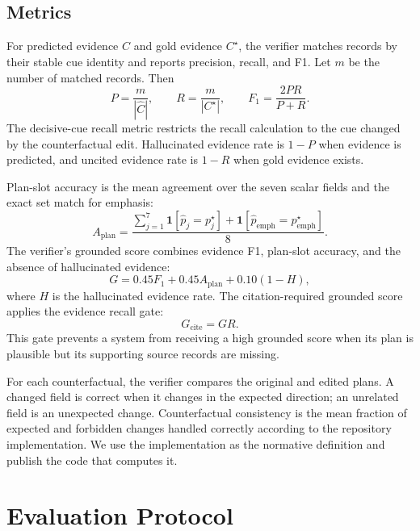 \documentclass{article}
\begin{document}
\subsection{Metrics}

For predicted evidence $\hat{C}$ and gold evidence $C^{\star}$, the verifier matches records by their stable cue identity and reports precision, recall, and F1. Let $m$ be the number of matched records. Then
\begin{equation}
 P = \frac{m}{|\hat{C}|}, \qquad R = \frac{m}{|C^{\star}|}, \qquad F_1 = \frac{2PR}{P+R}.
\end{equation}
The decisive-cue recall metric restricts the recall calculation to the cue changed by the counterfactual edit. Hallucinated evidence rate is $1-P$ when evidence is predicted, and uncited evidence rate is $1-R$ when gold evidence exists.

Plan-slot accuracy is the mean agreement over the seven scalar fields and the exact set match for emphasis:
\begin{equation}
 A_{\mathrm{plan}} = \frac{\sum_{j=1}^{7} \mathbf{1}[\hat{p}_j=p^{\star}_j] + \mathbf{1}[\hat{p}_{\mathrm{emph}}=p^{\star}_{\mathrm{emph}}]}{8}.
\end{equation}
The verifier's grounded score combines evidence F1, plan-slot accuracy, and the absence of hallucinated evidence:
\begin{equation}
 G = 0.45F_1 + 0.45A_{\mathrm{plan}} + 0.10(1-H),
\end{equation}
where $H$ is the hallucinated evidence rate. The citation-required grounded score applies the evidence recall gate:
\begin{equation}
 G_{\mathrm{cite}} = G R.
\end{equation}
This gate prevents a system from receiving a high grounded score when its plan is plausible but its supporting source records are missing.

For each counterfactual, the verifier compares the original and edited plans. A changed field is correct when it changes in the expected direction; an unrelated field is an unexpected change. Counterfactual consistency is the mean fraction of expected and forbidden changes handled correctly according to the repository implementation. We use the implementation as the normative definition and publish the code that computes it.

\section{Evaluation Protocol}
\end{document}

